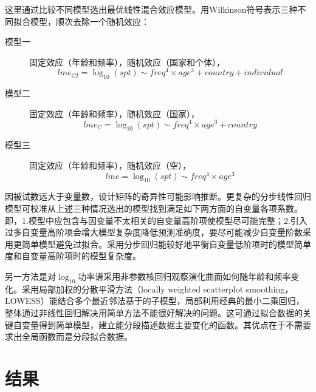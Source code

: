 这里通过比较不同模型选出最优线性混合效应模型。用Wilkinson符号表示三种不同拟合模型，顺次去除一个随机效应：
\bigskip
\begin{description}
	\item[模型一] 固定效应（年龄和频率），随机效应（国家和个体），
	\begin{equation}
	lme_{CI}=\log_{10}(spt)\sim{freq^4\times{age^3}+country+individual}
	\end{equation}
	\item[模型二] 固定效应（年龄和频率），随机效应（国家），
	\begin{equation}
	lme_{C}=\log_{10}(spt)\sim{freq^4\times{age^3}+country}
	\end{equation}
	\item[模型三] 固定效应（年龄和频率），随机效应（空），
	\begin{equation}
	lme=\log_{10}(spt)\sim{freq^4\times{age^3}}
	\end{equation}
\end{description}
\bigskip

因被试数远大于变量数，设计矩阵的奇异性可能影响推断。更复杂的分步线性回归模型可校准从上述三种情况选出的模型找到满足如下两方面的自变量各项系数。即，1.模型中应包含与因变量不太相关的自变量高阶项使模型尽可能完整；2.引入过多自变量高阶项会增大模型复杂度降低预测准确度，要尽可能减少自变量阶数采用更简单模型避免过拟合。采用分步回归能较好地平衡自变量低阶项时的模型简单度和自变量高阶项时的模型复杂度。

另一方法是对$\log_{10}$功率谱采用非参数核回归观察演化曲面如何随年龄和频率变化。采用局部加权的分散平滑方法（locally weighted scatterplot smoothing，LOWESS）能结合多个最近邻法基于的子模型，局部利用经典的最小二乘回归，整体通过非线性回归解决用简单方法不能很好解决的问题。这可通过拟合数据的关键自变量得到简单模型，建立能分段描述数据主要变化的函数。其优点在于不需要求出全局函数而是分段拟合数据。

\section{结果}
